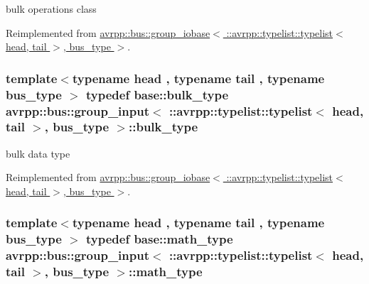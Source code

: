 bulk operations class 



Reimplemented from \hyperlink{structavrpp_1_1bus_1_1group__iobase_3_01_1_1avrpp_1_1typelist_1_1typelist_3_01head_00_01tail_01_4_00_01bus__type_01_4_afef5ea0856142cfafc467b0c45a86505}{avrpp::bus::group\_\-iobase$<$ ::avrpp::typelist::typelist$<$ head, tail $>$, bus\_\-type $>$}.

\hypertarget{structavrpp_1_1bus_1_1group__input_3_01_1_1avrpp_1_1typelist_1_1typelist_3_01head_00_01tail_01_4_00_01bus__type_01_4_a65f2a153fc07f1aa2bc497f2c32800ef}{
\subsubsection[{bulk\_\-type}]{\setlength{\rightskip}{0pt plus 5cm}template$<$typename head , typename tail , typename bus\_\-type $>$ typedef base::bulk\_\-type avrpp::bus::group\_\-input$<$ ::{\bf avrpp::typelist::typelist}$<$ head, tail $>$, bus\_\-type $>$::{\bf bulk\_\-type}}}
\label{structavrpp_1_1bus_1_1group__input_3_01_1_1avrpp_1_1typelist_1_1typelist_3_01head_00_01tail_01_4_00_01bus__type_01_4_a65f2a153fc07f1aa2bc497f2c32800ef}


bulk data type 



Reimplemented from \hyperlink{structavrpp_1_1bus_1_1group__iobase_3_01_1_1avrpp_1_1typelist_1_1typelist_3_01head_00_01tail_01_4_00_01bus__type_01_4_ac5f551221d1d4e6bb1cb6b5ec9f564d5}{avrpp::bus::group\_\-iobase$<$ ::avrpp::typelist::typelist$<$ head, tail $>$, bus\_\-type $>$}.

\hypertarget{structavrpp_1_1bus_1_1group__input_3_01_1_1avrpp_1_1typelist_1_1typelist_3_01head_00_01tail_01_4_00_01bus__type_01_4_a23cdc8f3ffca194e693a006c5140244d}{
\subsubsection[{math\_\-type}]{\setlength{\rightskip}{0pt plus 5cm}template$<$typename head , typename tail , typename bus\_\-type $>$ typedef base::math\_\-type avrpp::bus::group\_\-input$<$ ::{\bf avrpp::typelist::typelist}$<$ head, tail $>$, bus\_\-type $>$::{\bf math\_\-type}}}
\label{structavrpp_1_1bus_1_1group__input_3_01_1_1avrpp_1_1typelist_1_1typelist_3_01head_00_01tail_01_4_00_01bus__type_01_4_a23cdc8f3ffca194e693a006c5140244d}


